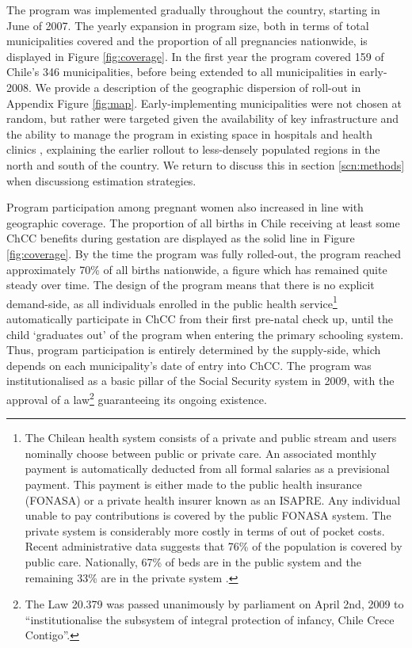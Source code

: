\documentclass[12pt]{article}
\begin{document}
\begin{spacing}{1.4}
The program was implemented gradually throughout the country, starting
in June of 2007.  The yearly expansion in program size, both in terms of
total municipalities covered and the proportion of all pregnancies
nationwide, is displayed in Figure \ref{fig:coverage}. In the first year
the program covered 159 of Chile's 346 municipalities, before being
extended to all municipalities in early-2008.  We provide a description
of the geographic dispersion of roll-out in Appendix Figure \ref{fig:map}.
Early-implementing municipalities were not chosen at random, but rather
were targeted given the availability of key infrastructure and the ability to
manage the program in existing space in hospitals and health clinics
\citep{Arrietetal2013}, explaining the earlier rollout to less-densely
populated regions in the north and south of the country.  We return to
discuss this in section \ref{scn:methods} when discussiong estimation
strategies.

Program participation
among pregnant women also increased in line with geographic coverage.  
The proportion of all births in Chile receiving at least some ChCC
benefits during gestation are displayed as the solid line in Figure
\ref{fig:coverage}.  By the time the program was fully rolled-out, the
program reached approximately 70\% of all births nationwide, a figure
which has remained quite steady over time.  The design of the program
means that there is no explicit demand-side, as all individuals
enrolled in the public health service\footnote{The Chilean health system
  consists of a private and public stream and users nominally choose
  between public or private care. An associated monthly payment is
  automatically deducted from all formal salaries as a previsional payment.
  This payment is either made to the public health insurance (FONASA) or
  a private health insurer known as an ISAPRE.  Any individual unable to
  pay contributions is covered by the public FONASA system.  The private
  system is considerably more costly in terms of out of pocket costs.
  Recent administrative data suggests that 76\% of the population is
  covered by public care.  Nationally, 67\% of beds are in the public
  system and the remaining 33\% are in the private system \citep{DEIS2016}.}
automatically participate in ChCC from their first pre-natal check up,
until the child `graduates out' of the program when entering the primary
schooling system.  Thus, program participation is entirely determined
by the supply-side, which depends on each municipality's date of entry
into ChCC.  The program was institutionalised as a basic pillar of the
Social Security system in 2009, with the approval of a law\footnote{The
  Law 20.379 was passed unanimously by parliament on April 2nd, 2009 to
  ``institutionalise the subsystem of integral protection of infancy,
  Chile Crece Contigo''.} guaranteeing its ongoing existence.


\end{spacing}
\end{document}
